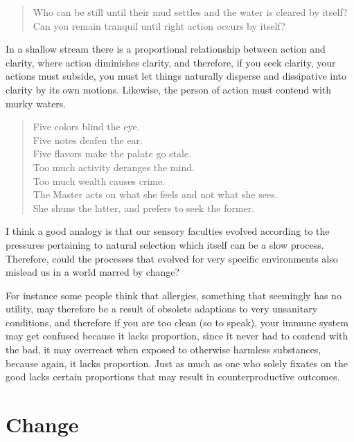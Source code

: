 \begin{verse}
Who can be still until their mud settles and the water is cleared by itself?\\
Can you remain tranquil until right action occurs by itself?\\
\end{verse}

In a shallow stream there is a proportional relationship between action and clarity, where action diminishes clarity, and therefore, if you seek clarity, your actions must subside, you must let things naturally disperse and dissipative into clarity by its own motions. Likewise, the person of action must contend with murky waters. 

\begin{verse}
Five colors blind the eye.\\
Five notes deafen the ear.\\
Five flavors make the palate go stale.\\
Too much activity deranges the mind.\\
Too much wealth causes crime.\\
The Master acts on what she feels and not what she sees.\\
She shuns the latter, and prefers to seek the former.\\
\end{verse}

I think a good analogy is that our sensory faculties evolved according to the pressures pertaining to natural selection which itself can be a slow process. Therefore, could the processes that evolved for very specific environments also mislead us in a world marred by change?

For instance some people think that allergies, something that seemingly has no utility, may therefore be a result of obsolete adaptions to very unsanitary conditions, and therefore if you are too clean (so to speak), your immune system may get confused because it lacks proportion, since it never had to contend with the bad, it may overreact when exposed to otherwise harmless substances, because again, it lacks proportion. Just as much as one who solely fixates on the good lacks certain proportions that may result in counterproductive outcomes. 


\section{Change}

